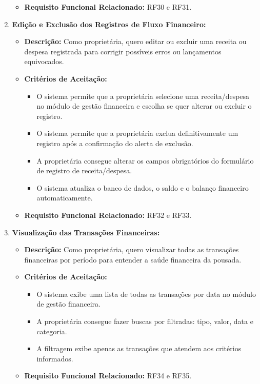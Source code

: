 \documentclass[
	12pt,				%
	openany,			%
	twoside,			%
	a4paper,			%
	english,			%
	french,				%
	spanish,			%
	brazil				%
	]{abntex2}
\begin{document}
\begin{enumerate}[label=\textbf{\arabic*.}]
\begin{itemize}
	 	\item \textbf{Requisito Funcional Relacionado:} RF30 e RF31.
	 \end{itemize} 
	  \item \textbf{Edição e Exclusão dos Registros de Fluxo Financeiro:}
	 \begin{itemize}
	 	\item \textbf{Descrição:} Como proprietária, quero editar ou excluir uma receita ou despesa registrada para corrigir possíveis erros ou lançamentos equivocados.
	 	\item \textbf{Critérios de Aceitação:}
	 	\begin{itemize}
	 		\item O sistema permite que a proprietária selecione uma receita/despesa no módulo de gestão financeira e escolha se quer alterar ou excluir o registro.
	 		\item O sistema permite que a proprietária exclua definitivamente um registro após a confirmação do alerta de exclusão.
	 		\item A proprietária consegue alterar os campos obrigatórios do formulário de registro de receita/despesa.
	 		\item O sistema atualiza o banco de dados, o saldo e o balanço financeiro automaticamente. 
	 	\end{itemize}
	 	\item \textbf{Requisito Funcional Relacionado:} RF32 e RF33.
	 \end{itemize} 
	  \item \textbf{Visualização das Transações Financeiras:}
	 \begin{itemize}
	 	\item \textbf{Descrição:} Como proprietária, quero visualizar todas as transações financeiras por período para entender a saúde financeira da pousada.
	 	\item \textbf{Critérios de Aceitação:}
	 	\begin{itemize}
	 		\item O sistema exibe uma lista de todas as transações por data no módulo de gestão financeira.
	 		\item A proprietária consegue fazer buscas por filtradas: tipo, valor, data e categoria.
	 		\item A filtragem exibe apenas as transações que atendem aos critérios informados.
	 	\end{itemize}
	 	\item \textbf{Requisito Funcional Relacionado:} RF34 e RF35.

\end{itemize}
\end{enumerate}
\end{document}
